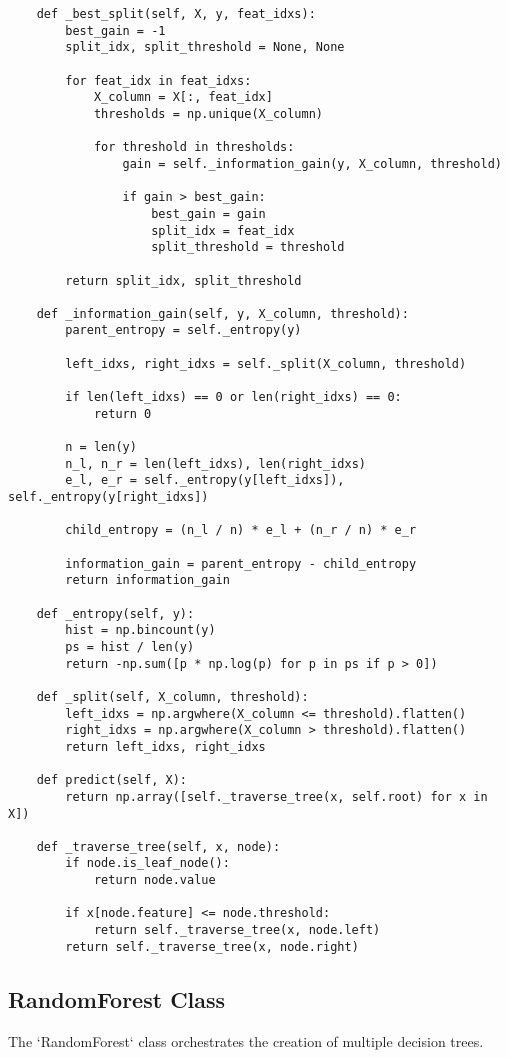 \documentclass[12pt,a4paper]{article}
\begin{document}
\begin{lstlisting}
    def _best_split(self, X, y, feat_idxs):
        best_gain = -1
        split_idx, split_threshold = None, None

        for feat_idx in feat_idxs:
            X_column = X[:, feat_idx]
            thresholds = np.unique(X_column)

            for threshold in thresholds:
                gain = self._information_gain(y, X_column, threshold)

                if gain > best_gain:
                    best_gain = gain
                    split_idx = feat_idx
                    split_threshold = threshold

        return split_idx, split_threshold

    def _information_gain(self, y, X_column, threshold):
        parent_entropy = self._entropy(y)

        left_idxs, right_idxs = self._split(X_column, threshold)

        if len(left_idxs) == 0 or len(right_idxs) == 0:
            return 0

        n = len(y)
        n_l, n_r = len(left_idxs), len(right_idxs)
        e_l, e_r = self._entropy(y[left_idxs]), self._entropy(y[right_idxs])

        child_entropy = (n_l / n) * e_l + (n_r / n) * e_r

        information_gain = parent_entropy - child_entropy
        return information_gain

    def _entropy(self, y):
        hist = np.bincount(y)
        ps = hist / len(y)
        return -np.sum([p * np.log(p) for p in ps if p > 0])

    def _split(self, X_column, threshold):
        left_idxs = np.argwhere(X_column <= threshold).flatten()
        right_idxs = np.argwhere(X_column > threshold).flatten()
        return left_idxs, right_idxs

    def predict(self, X):
        return np.array([self._traverse_tree(x, self.root) for x in X])

    def _traverse_tree(self, x, node):
        if node.is_leaf_node():
            return node.value

        if x[node.feature] <= node.threshold:
            return self._traverse_tree(x, node.left)
        return self._traverse_tree(x, node.right)
\end{lstlisting}

\subsection{RandomForest Class}
The `RandomForest` class orchestrates the creation of multiple decision trees.
\end{document}
